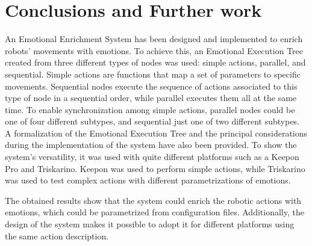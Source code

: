 \documentclass[letterpaper, 10 pt, conference]{ieeeconf}  %
\begin{document}
\section{Conclusions and Further work}
An Emotional Enrichment System has been designed and implemented to enrich robots' movements with emotions. To achieve this,  an Emotional Execution Tree created from three different types of nodes was used: simple actions, parallel, and sequential. Simple actions are functions that map a set of parameters to specific movements. Sequential nodes execute the sequence of actions associated to this type of node in a sequential order, while parallel executes them all at the same time. To enable synchronization among simple actions, parallel nodes could be one of four different subtypes, and sequential just one of two different subtypes. A formalization of the Emotional Execution Tree and the principal considerations during the implementation of the system have also been provided. To show the system's versatility, it was used with quite different platforms such as a Keepon Pro and Triskarino. Keepon was used to perform simple actions, while Triskarino was used to test complex actions with different parametrizations of emotions.

The obtained results show that the system could enrich the robotic actions with emotions, which could be parametrized from configuration files. Additionally, the design of the system makes it possible to  adopt it for different platforms using the same action description.
%



\addtolength{\textheight}{-12cm}
\end{document}
